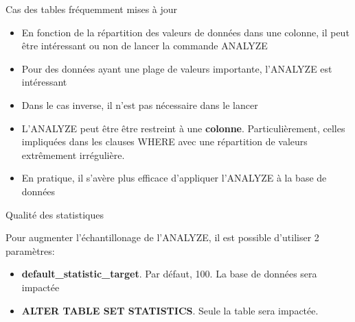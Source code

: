 
\begin{frame}{Cas des tables fréquemment mises à jour}

   \begin{itemize}
      \item En fonction de la répartition des valeurs de données dans une colonne, il peut être intéressant ou non de lancer la commande ANALYZE
      \item Pour des données ayant une plage de valeurs importante, l'ANALYZE est intéressant
      \item Dans le cas inverse, il n'est pas nécessaire dans le lancer
      \item L'ANALYZE peut être être restreint à une \textbf{colonne}. Particulièrement, celles impliquées dans les clauses WHERE avec une répartition de valeurs extrêmement irrégulière.
      \item En pratique, il s'avère plus efficace d'appliquer l'ANALYZE à la base de données
   \end{itemize}

\end{frame}


\begin{frame}{Qualité des statistiques}

   Pour augmenter l'échantillonage de l'ANALYZE, il est possible d'utiliser 2 paramètres:
   \begin{itemize}
      \item \textbf{default\_statistic\_target}. Par défaut, 100. La base de données sera impactée
      \item \textbf{ALTER TABLE SET STATISTICS}. Seule la table sera impactée.
   \end{itemize}

\begin{toile}
\end{toile}

\end{frame}


